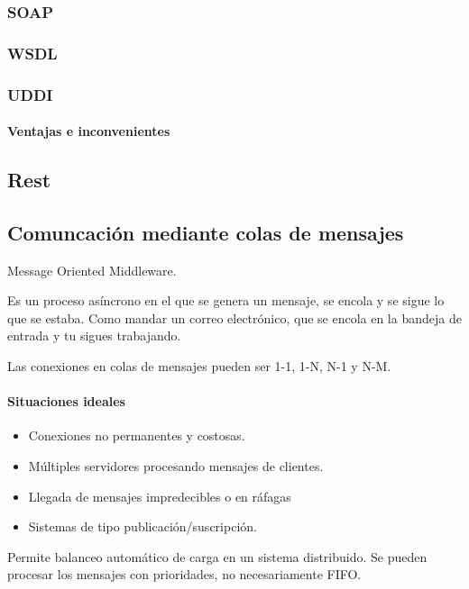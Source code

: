 \subsubsection{SOAP}
\subsubsection{WSDL}
\subsubsection{UDDI}

\paragraph{Ventajas e inconvenientes}

\subsection{Rest}

\subsection{Comuncación mediante colas de mensajes}

\begin{defn}[MOM]
Message Oriented Middleware.

Es un proceso asíncrono en el que se genera un mensaje, se encola y se sigue lo que se estaba. Como mandar un correo electrónico, que se encola en la bandeja de entrada y tu sigues trabajando.
\end{defn}

Las conexiones en colas de mensajes pueden ser 1-1, 1-N, N-1 y N-M.

\paragraph{Situaciones ideales}
\begin{itemize}
 	\item Conexiones no permanentes y costosas.
 	\item Múltiples servidores procesando mensajes de clientes.
 	\item Llegada de mensajes impredecibles o en ráfagas
 	\item Sistemas de tipo publicación/suscripción.
 \end{itemize}
 \obs Permite balanceo automático de carga en un sistema distribuido. Se pueden procesar los mensajes con prioridades, no necesariamente FIFO.

